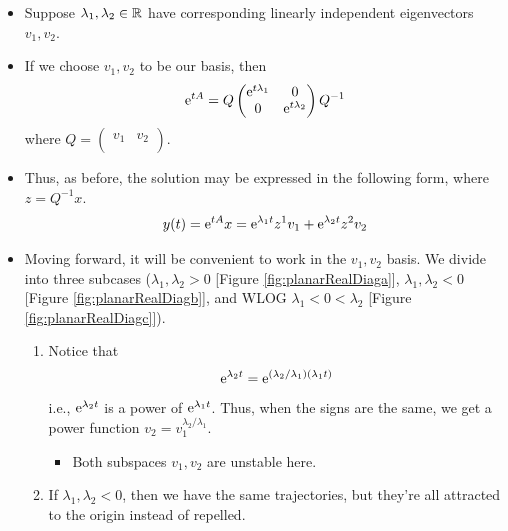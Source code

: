 \documentclass[../notes.tex]{subfiles}
\begin{document}
\begin{itemize}
\begin{figure}[h!]
        \label{fig:planarRealDiag}
    \end{figure}
    \begin{itemize}
        \item Suppose $\lambda_1,\lambda_2\in\R$ have corresponding linearly independent eigenvectors $v_1,v_2$.
        \item If we choose $v_1,v_2$ to be our basis, then
        \begin{equation*}
            \e[tA] = Q
            \begin{pmatrix}
                \e[t\lambda_1] & 0\\
                0 & \e[t\lambda_2]\\
            \end{pmatrix}
            Q^{-1}
        \end{equation*}
        where $
            Q =
            \begin{pmatrix}
                v_1 & v_2\\
            \end{pmatrix}
        $.
        \item Thus, as before, the solution may be expressed in the following form, where $z=Q^{-1}x$.
        \begin{equation*}
            y(t) = \e[tA]x
            = \e[\lambda_1t]z^1v_1+\e[\lambda_2t]z^2v_2
        \end{equation*}
        \item Moving forward, it will be convenient to work in the $v_1,v_2$ basis. We divide into three subcases ($\lambda_1,\lambda_2>0$ [Figure \ref{fig:planarRealDiaga}], $\lambda_1,\lambda_2<0$ [Figure \ref{fig:planarRealDiagb}], and WLOG $\lambda_1<0<\lambda_2$ [Figure \ref{fig:planarRealDiagc}]).
        \begin{enumerate}
            \item Notice that
            \begin{equation*}
                \e[\lambda_2t] = \e[(\lambda_2/\lambda_1)(\lambda_1t)]
            \end{equation*}
            i.e., $\e[\lambda_2t]$ is a power of $\e[\lambda_1t]$. Thus, when the signs are the same, we get a power function $v_2=v_1^{\lambda_2/\lambda_1}$.
            \begin{itemize}
                \item Both subspaces $v_1,v_2$ are unstable here.
            \end{itemize}
            \item If $\lambda_1,\lambda_2<0$, then we have the same trajectories, but they're all attracted to the origin instead of repelled.

\end{enumerate}
\end{itemize}
\end{itemize}
\end{document}

